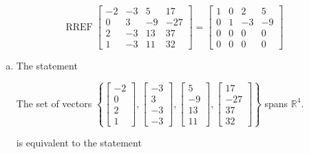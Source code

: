 \begin{exerciseAnswer} 


\[\operatorname{RREF} \left[\begin{array}{cccc}
-2 & -3 & 5 & 17 \\
0 & 3 & -9 & -27 \\
2 & -3 & 13 & 37 \\
1 & -3 & 11 & 32
\end{array}\right] = \left[\begin{array}{cccc}
1 & 0 & 2 & 5 \\
0 & 1 & -3 & -9 \\
0 & 0 & 0 & 0 \\
0 & 0 & 0 & 0
\end{array}\right] \]


\begin{enumerate}[(a)]
\item The statement 
\begin{center}\begin{minipage}{0.8\textwidth}
 The set of vectors \( \left\{ \left[\begin{array}{c}
-2 \\
0 \\
2 \\
1
\end{array}\right] , \left[\begin{array}{c}
-3 \\
3 \\
-3 \\
-3
\end{array}\right] , \left[\begin{array}{c}
5 \\
-9 \\
13 \\
11
\end{array}\right] , \left[\begin{array}{c}
17 \\
-27 \\
37 \\
32
\end{array}\right] \right\} \) spans \(\mathbb{R}^4\). 
\end{minipage}\end{center}
     is equivalent to the statement 
\begin{center}\begin{minipage}{0.8\textwidth}
 The vector equation \( x_{1} \left[\begin{array}{c}
-2 \\
0 \\

\end{array}
\end{minipage}
\end{center}
\end{enumerate}
\end{exerciseAnswer}
